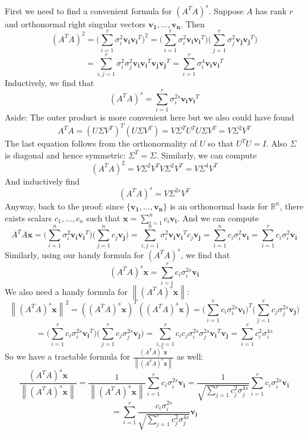 \documentclass{tufte-handout}
\newcommand{\norm}[1]{\left\lVert#1\right\rVert}
\begin{document}
\noindent First we need to find a convenient formula for $(A^TA)^s$. Suppose $A$ has rank $r$ and orthonormal right singular vectors $\mathbf{v_1},...,\mathbf{v_n}$. Then 
\[
(A^TA)^2=\Big(\sum_{i=1}^{r}\sigma_i^2\mathbf{v_i}\mathbf{v_i}^T\Big)^2
=
\Big(\sum_{i=1}^{r}\sigma_i^2\mathbf{v_i}\mathbf{v_i}^T\Big)
\Big(\sum_{j=1}^{r}\sigma_j^2\mathbf{v_j}\mathbf{v_j}^T\Big)
\]
\[
=
\sum_{i,j=1}^{r}\sigma_i^2\sigma_j^2\mathbf{v_i}\mathbf{v_i}^T\mathbf{v_j}\mathbf{v_j}^T
=
\sum_{i=1}^{r}\sigma_i^4\mathbf{v_i}\mathbf{v_i}^T
\]
Inductively, we find that
\[
(A^TA)^s=
\sum_{i=1}^{r}\sigma_i^{2s}\mathbf{v_i}\mathbf{v_i}^T
\]
\noindent Aside: The outer product is more convenient here but we also could have found
\[
A^TA=(U\Sigma V^T)^T(U\Sigma V^T)=V\Sigma^TU^TU\Sigma V^T=V\Sigma^2V^T
\]
The last equation follows from the orthonormality of $U$ so that $U^TU=I$. Also $\Sigma$ is diagonal and hence symmetric: $\Sigma^T=\Sigma$. Similarly, we can compute
\[
(A^TA)^2=V\Sigma^2V^TV\Sigma^2V^T=V\Sigma^4V^T
\]
And inductively find
\[
(A^TA)^s=V\Sigma^{2s}V^T
\]
\noindent Anyway, back to the proof: since $\{\mathbf{v_1},...,\mathbf{v_n}\}$ is an orthonormal basis for $\mathbb{R}^n$, there exists scalars $c_1,...,c_n$ such that $\mathbf{x}=\sum_{i=1}^nc_i\mathbf{v_i}$. And we can compute
\[
A^TA\mathbf{x}=
\Big(\sum_{i=1}^{n}\sigma_i^2\mathbf{v_i}\mathbf{v_i}^T\Big)\Big(\sum_{j=1}^nc_j\mathbf{v_j}\Big)
=
\sum_{i,j=1}^{n}\sigma_i^2\mathbf{v_i}\mathbf{v_i}^Tc_j\mathbf{v_j}
=
\sum_{i=1}^nc_i\sigma_{i}^2\mathbf{v_i}
=
\sum_{i=1}^rc_i\sigma_{i}^2\mathbf{v_i}
\]
Similarly, using our handy formula for $(A^TA)^s$, we find that
\[
(A^TA)^s\mathbf{x}=
\sum_{i=1}^rc_i\sigma_{i}^{2s}\mathbf{v_i}
\]
We also need a handy formula for $\norm{(A^TA)^s\mathbf{x}}$:
\[
\norm{(A^TA)^s\mathbf{x}}^2=
((A^TA)^s\mathbf{x})^T((A^TA)^s\mathbf{x})
=
\Big(\sum_{i=1}^rc_i\sigma_{i}^{2s}\mathbf{v_i}\Big)^T\Big(\sum_{j=1}^rc_j\sigma_{j}^{2s}\mathbf{v_j}\Big)
\]
\[
=
\Big(\sum_{i=1}^rc_i\sigma_{i}^{2s}\mathbf{v_i}^T\Big)\Big(\sum_{j=1}^rc_j\sigma_{j}^{2s}\mathbf{v_j}\Big)
=
\sum_{i,j=1}^rc_ic_j\sigma_{i}^{2s}\sigma_{j}^{2s}\mathbf{v_i}^T\mathbf{v_j}
=\sum_{i=1}^rc_i^2\sigma_{i}^{4s}
\]
So we have a tractable formula for $\frac{(A^TA)^s\mathbf{x}}{\norm{(A^TA)^s\mathbf{x}}}$ as well:
\[
\frac{(A^TA)^s\mathbf{x}}{\norm{(A^TA)^s\mathbf{x}}}
=
\frac{1}{\norm{(A^TA)^s\mathbf{x}}}\sum_{i=1}^rc_i\sigma_{i}^{2s}\mathbf{v_i}
=
\frac{1}{\sqrt{\sum_{j=1}^rc_j^2\sigma_{j}^{4s}}}\sum_{i=1}^rc_i\sigma_{i}^{2s}\mathbf{v_i}
\]
\[
=
\sum_{i=1}^r\frac{c_i\sigma_{i}^{2s}}{\sqrt{\sum_{j=1}^rc_j^2\sigma_{j}^{4s}}}\mathbf{v_i}
\]
\end{document}
